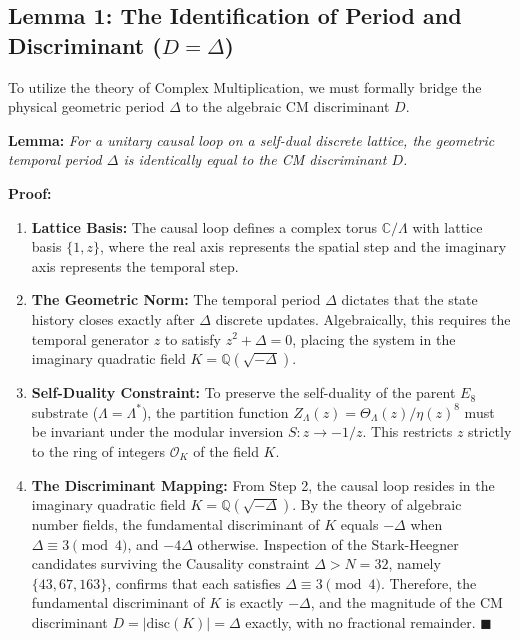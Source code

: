\subsection{Lemma 1: The Identification of Period and Discriminant (\texorpdfstring{$D = \Delta$}{D=Delta})}

To utilize the theory of Complex Multiplication, we must formally bridge the physical geometric period $\Delta$ to the algebraic CM discriminant $D$.

\textbf{Lemma:} \textit{For a unitary causal loop on a self-dual discrete lattice, the geometric temporal period $\Delta$ is identically equal to the CM discriminant $D$.}

\textbf{Proof:}
\begin{enumerate}
    \item \textbf{Lattice Basis:} The causal loop defines a complex torus $\mathbb{C}/\Lambda$ with lattice basis $\{1, z\}$, where the real axis represents the spatial step and the imaginary axis represents the temporal step.
    
    \item \textbf{The Geometric Norm:} The temporal period $\Delta$ dictates that the state history closes exactly after $\Delta$ discrete updates. Algebraically, this requires the temporal generator $z$ to satisfy $z^2 + \Delta = 0$, placing the system in the imaginary quadratic field $K = \mathbb{Q}(\sqrt{-\Delta})$.
    
    \item \textbf{Self-Duality Constraint:} To preserve the self-duality of the parent $E_8$ substrate ($\Lambda = \Lambda^*$), the partition function $Z_\Lambda(z) = \Theta_\Lambda(z)/\eta(z)^8$ must be invariant under the modular inversion $S: z \to -1/z$. This restricts $z$ strictly to the ring of integers $\mathcal{O}_K$ of the field $K$.
    
    \item \textbf{The Discriminant Mapping:} From Step 2, the causal loop resides in the imaginary quadratic field $K = \mathbb{Q}(\sqrt{-\Delta})$. By the theory of algebraic number fields, the fundamental discriminant of $K$ equals $-\Delta$ when $\Delta \equiv 3 \pmod{4}$, and $-4\Delta$ otherwise. Inspection of the Stark-Heegner candidates surviving the Causality constraint $\Delta > N = 32$, namely $\{43, 67, 163\}$, confirms that each satisfies $\Delta \equiv 3 \pmod{4}$. Therefore, the fundamental discriminant of $K$ is exactly $-\Delta$, and the magnitude of the CM discriminant $D = |\text{disc}(K)| = \Delta$ exactly, with no fractional remainder. $\blacksquare$
\end{enumerate}

